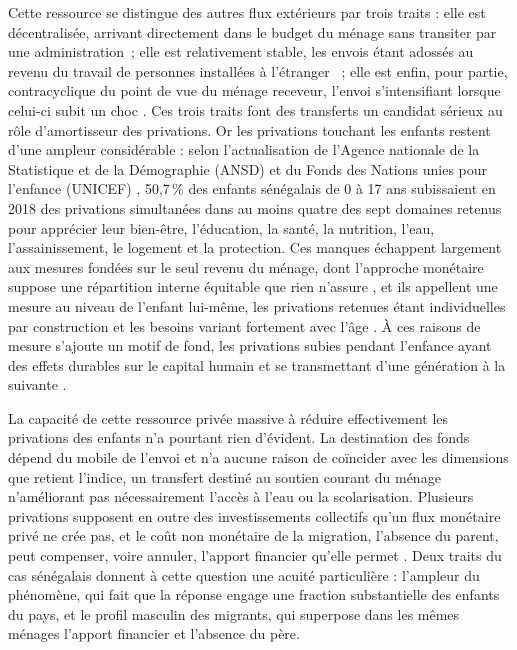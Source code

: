 Cette ressource se distingue des autres flux extérieurs par trois traits :
elle est décentralisée, arrivant directement dans le budget du ménage sans
transiter par une administration~; elle est relativement stable, les
envois étant adossés au revenu du travail de personnes installées à
l'étranger \parencite{maimbo2005}~; elle est enfin, pour partie,
contracyclique du point de vue du ménage receveur, l'envoi s'intensifiant
lorsque celui-ci subit un choc \parencite{gubert2002}. Ces trois traits
font des transferts un candidat sérieux au rôle d'amortisseur des
privations. Or les privations touchant les enfants restent d'une ampleur
considérable : selon l'actualisation de l'Agence nationale de la
Statistique et de la Démographie (ANSD) et du Fonds des Nations unies
pour l'enfance (UNICEF)
\parencite{ansd2024}, 50,7\,\% des enfants sénégalais de 0 à 17 ans
subissaient en 2018 des privations simultanées dans au moins quatre des
sept domaines retenus pour apprécier leur bien-être, l'éducation, la
santé, la nutrition, l'eau, l'assainissement, le logement et la
protection. Ces manques échappent largement aux mesures fondées sur le
seul revenu du ménage, dont l'approche monétaire suppose une répartition
interne équitable que rien n'assure \parencite{deaton1997}, et ils
appellent une mesure au niveau de l'enfant lui-même, les privations
retenues étant individuelles par construction et les besoins variant
fortement avec l'âge \parencite{deneubourg2012}. À ces raisons de mesure
s'ajoute un motif de fond, les privations subies pendant l'enfance ayant
des effets durables sur le capital humain et se transmettant d'une
génération à la suivante \parencite{gordon2003}.

La capacité de cette ressource privée massive à réduire effectivement les
privations des enfants n'a pourtant rien d'évident. La destination des
fonds dépend du mobile de l'envoi et n'a aucune raison de coïncider avec
les dimensions que retient l'indice, un transfert destiné au soutien
courant du ménage n'améliorant pas nécessairement l'accès à l'eau ou la
scolarisation. Plusieurs privations supposent en outre des investissements
collectifs qu'un flux monétaire privé ne crée pas, et le coût non
monétaire de la migration, l'absence du parent, peut compenser, voire
annuler, l'apport financier qu'elle permet \parencite{mansuri2006,
davis2016}. Deux traits du cas sénégalais donnent à cette question une
acuité particulière : l'ampleur du phénomène, qui fait que la réponse
engage une fraction substantielle des enfants du pays, et le profil
masculin des migrants, qui superpose dans les mêmes ménages l'apport
financier et l'absence du père.

